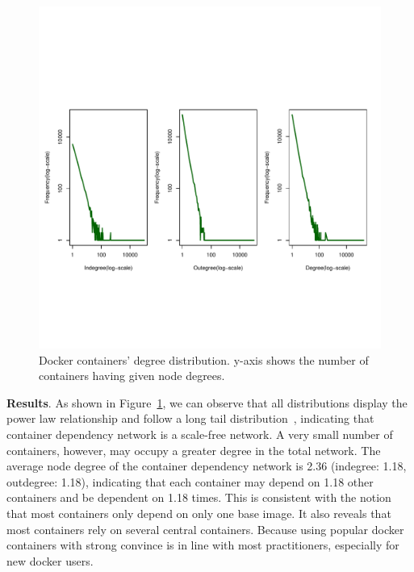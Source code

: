 \documentclass[sigconf]{acmart}
\begin{document}
\begin{figure}[h!]
\centering
\includegraphics[width=1\columnwidth]{picture/image_distribution_degree.pdf}\vspace{-0.3cm}
\caption{Docker containers' degree distribution. y-axis shows the number of containers having given node degrees.}\vspace{-0.3cm}
\label{fig:distribution}
\end{figure}

\noindent\textbf{Results}. 
As shown in Figure~\ref{fig:distribution}, we can observe that all distributions display the power law relationship and follow a long tail distribution~\cite{anderson2007long},  
indicating that container dependency network is a scale-free network. A very small number of containers, however, may occupy a greater degree in the total network. 
The average node degree of the container dependency network is 2.36  (indegree: 1.18, outdegree: 1.18), indicating that each container may depend on 1.18 other containers and be dependent on 1.18 times. 
This is consistent with the notion that most containers only depend on only one base image. 
It also reveals that most containers rely on several central containers. 
Because using popular docker containers with strong convince is in line with most practitioners, especially for new docker users. 
\end{document}
